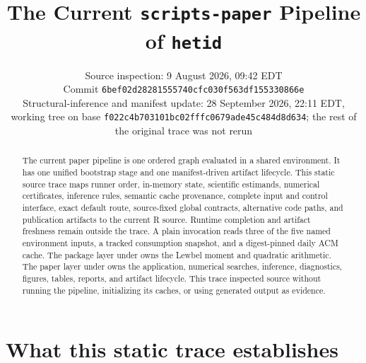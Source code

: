 \documentclass[11pt]{article}
\title{The Current \texttt{scripts-paper} Pipeline of \texttt{hetid}}
\author{}
\date{Source inspection: 9 August 2026, 09:42 EDT\\
Commit \texttt{6bef02d28281555740cfc030f563df155330866e}\\
Structural-inference and manifest update: 28 September 2026, 22:11 EDT,\\
working tree on base \texttt{f022c4b703101bc02fffc0679ade45c484d8d634}; the rest of
the original trace was not rerun}
\DeclareRobustCommand{\file}[1]{\path{#1}}
\begin{document}
\maketitle

\begin{abstract}
The current paper pipeline is one ordered graph evaluated in a shared
environment. It has one unified bootstrap stage and one manifest-driven
artifact lifecycle. This static source trace maps runner order, in-memory state,
scientific estimands, numerical certificates, inference rules, semantic cache provenance,
complete input and control interface, exact default route,
source-fixed global contracts, alternative code paths, and publication
artifacts to the current R source. Runtime completion and
artifact freshness remain outside the trace. A plain invocation reads three of
the five named environment inputs, a tracked consumption snapshot, and a
digest-pinned daily ACM cache. The package layer under \file{R/}
owns the Lewbel moment and quadratic arithmetic. The paper layer under
\file{scripts-paper/} owns the application, numerical searches, inference,
diagnostics, figures, tables, reports, and artifact lifecycle. This trace
inspected source without running the pipeline, initializing its caches, or
using generated output as evidence.
\end{abstract}

{\small\tableofcontents}

\section{What this static trace establishes}
\label{sec:contracts-summary}
\end{document}

